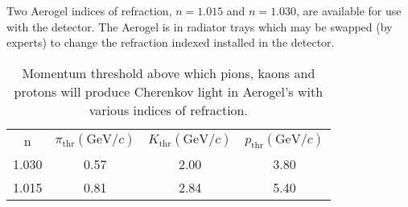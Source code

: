{Two Aerogel indices of refraction, $n=1.015$ and $n=1.030$, are
available for use with the detector.  The Aerogel is in radiator
trays which may be swapped (by experts) to change the refraction
indexed installed in the detector.


\begin{table}
\caption{Momentum threshold above which pions, kaons and protons will
produce Cherenkov light in Aerogel's with various indices of refraction.
\label{tab:hms_aerogel}}
\begin{center}
\begin{tabular}{cccc}
  n& $\pi_{\textrm{thr}}(\textrm{GeV}/c)$ & $K_{\textrm{
  thr}}(\textrm{GeV}/c)$ & $p_{\textrm{thr}}(\textrm{GeV}/c)$\\
  1.030 & 0.57 & 2.00 & 3.80 \\
  1.015 & 0.81 & 2.84 & 5.40 \\
\end{tabular}
\end{center}
\end{table}

}%
